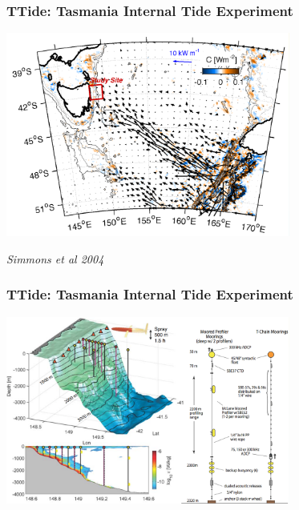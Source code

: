 \documentclass[aspectratio=169]{beamer}
\begin{document}
\begin{frame}
  \frametitle{TTide: Tasmania Internal Tide Experiment}
  \begin{center}
  \includegraphics[width=0.7\textwidth]{doc/SiteMap.png}
  \end{center}
  \emph{Simmons et al 2004}
\end{frame}

\begin{frame}
  \frametitle{TTide: Tasmania Internal Tide Experiment}
  \begin{center}
  \includegraphics[width=0.7\textwidth]{doc/ExperimentSketch.png}
  \end{center}
\end{frame}
\end{document}
